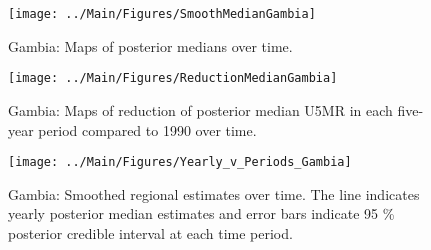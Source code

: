 \documentclass[12pt]{article}\usepackage[]{graphicx}\usepackage[]{color}
\newenvironment{knitrout}{}{} %
\begin{document}
\begin{knitrout}
\color{fgcolor}\begin{figure}[bht]

{\centering \texttt{[image: ../Main/Figures/SmoothMedianGambia]} 

}

\caption[Gambia]{Gambia: Maps of posterior medians over time.}\label{fig:unnamed-chunk-134}
\end{figure}


\end{knitrout}
\begin{knitrout}
\color{fgcolor}\begin{figure}[bht]

{\centering \texttt{[image: ../Main/Figures/ReductionMedianGambia]} 

}

\caption[Gambia]{Gambia: Maps of reduction of posterior median U5MR in each five-year period compared to 1990 over time.}\label{fig:unnamed-chunk-135}
\end{figure}


\end{knitrout}
\begin{knitrout}
\color{fgcolor}\begin{figure}[bht]

{\centering \texttt{[image: ../Main/Figures/Yearly\_v\_Periods\_Gambia]} 

}

\caption[Gambia]{Gambia: Smoothed regional estimates over time. The line indicates yearly posterior median estimates and error bars indicate 95 \% posterior credible interval at each time period.}\label{fig:unnamed-chunk-136}
\end{figure}


\end{knitrout}
\end{document}
